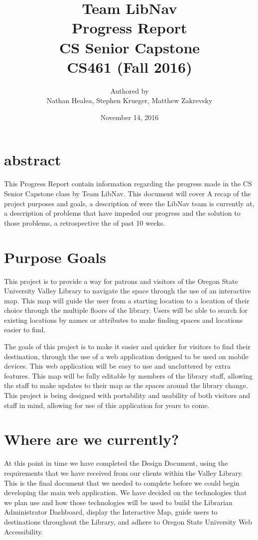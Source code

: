 \documentclass[letterpaper,10pt,titlepage, onecolumn, compsoc]{IEEEtran}
\title{Team LibNav \\ Progress Report \\ CS Senior Capstone \\ \vspace{2mm}\small CS461 (Fall 2016)}
\author{Authored by \\ Nathan Healea, Stephen Krueger, Matthew Zakrevsky}
\date{November 14, 2016}
\begin{document}
\maketitle

\section*{abstract}
This Progress Report contain information regarding the progress made in the CS Senior Capstone class by Team LibNav. This document will cover A recap of the project purposes and goals, a description of were the LibNav team is currently at, a description of problems that have impeded our progress and the solution to those problems, a  retrospective the of past 10 weeks.
\newpage

\tableofcontents
\newpage

\section{Purpose\/ Goals}
This project is to provide a way for patrons and visitors of the Oregon State University Valley Library to navigate the space through the use of an interactive map. This map will guide the user from a starting location to a location of their choice through the multiple floors of the library. Users will be able to search for existing locations by names or attributes to make finding spaces and locations easier to find. 

The goals of this project is to make it easier and quicker for visitors to find their destination, through the use of a web application designed to be used on mobile devices. This web application will be easy to use and uncluttered by extra features. This map will be fully editable by members of the library staff, allowing the staff to make updates to their map as the spaces around the library change. This project is being designed with portability and usability of both visitors and staff in mind, allowing for use of this application for years to come.

\section{Where are we currently?}
At this point in time we have completed the Design Document, using the requirements that we have received from our clients within the Valley Library. This is the final document that we needed to complete before we could begin developing the main web application. We have decided on the technologies that we plan use and how those technologies will be used to build the Librarian Administrator Dashboard, display the Interactive Map, guide users to destinations throughout the Library, and adhere to Oregon State University Web Accessibility. 
\end{document}
